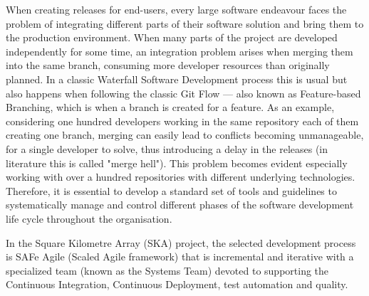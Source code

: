 \documentclass[a4paper,
	       keeplastbox,   %
	       References
	       ]{jacow}
\begin{document}
When creating releases for end-users, every large software endeavour faces the problem of integrating different parts of their software solution and bring them to the production environment. When many parts of the project are developed independently for some time, an integration problem arises when merging them into the same branch, consuming more developer resources than originally planned. In a classic Waterfall Software Development process this is usual but also happens when following the classic Git Flow — also known as Feature-based Branching, which is when a branch is created for a feature. As an example, considering one hundred developers working in the same repository each of them creating one branch, merging can easily lead to conflicts becoming unmanageable, for a single developer to solve, thus introducing a delay in the releases (in literature this is called "merge hell"). This problem becomes evident especially working with over a hundred repositories with different underlying technologies. Therefore, it is essential to develop a standard set of tools and guidelines to systematically manage and control different phases of the software development life cycle throughout the organisation.

In the Square Kilometre Array (SKA) project, the selected development process is SAFe Agile (Scaled Agile framework) that is incremental and iterative with a specialized team (known as the Systems Team) devoted to supporting the Continuous Integration, Continuous Deployment, test automation and quality.
\end{document}
